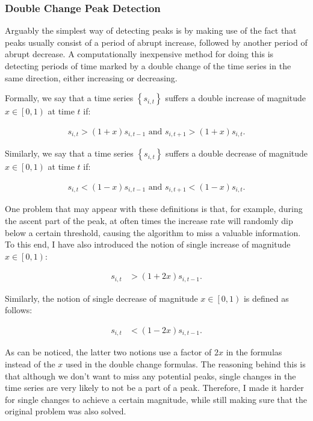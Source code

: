 \subsubsection{Double Change Peak Detection}

Arguably the simplest way of detecting peaks is by making use of the fact that peaks usually consist of a period of abrupt increase, followed by another period of abrupt decrease. A computationally inexpensive method for doing this is detecting periods of time marked by a double change of the time series in the same direction, either increasing or decreasing.

Formally, we say that a time series $\left\{ s_{i, t} \right\}$ suffers a double increase of magnitude $x \in \left[ 0, 1 \right)$ at time $t$ if:

\begin{align}
\label{eq:double-increase}
s_{i, t} > \left( 1 + x \right) s_{i, t - 1} \textrm{ and } s_{i, t + 1} > \left( 1 + x \right) s_{i, t}.
\end{align}

Similarly, we say that a time series $\left\{ s_{i, t} \right\}$ suffers a double decrease of magnitude $x \in \left[ 0, 1 \right)$ at time $t$ if:

\begin{align}
\label{eq:double-increase}
s_{i, t} < \left( 1 - x \right) s_{i, t - 1} \textrm{ and } s_{i, t + 1} < \left( 1 - x \right) s_{i, t}.
\end{align}

One problem that may appear with these definitions is that, for example, during the ascent part of the peak, at often times the increase rate will randomly dip below a certain threshold, causing the algorithm to miss a valuable information. To this end, I have also introduced the notion of single increase of magnitude $x \in \left[ 0, 1 \right)$:

\begin{align}
\label{eq:single-increase}
s_{i, t} &> \left( 1 + 2x \right) s_{i, t - 1}.
\end{align}

Similarly, the notion of single decrease of magnitude $x \in \left[ 0, 1 \right)$ is defined as follows:

\begin{align}
\label{eq:single-decrease}
s_{i, t} &< \left( 1 - 2x \right) s_{i, t - 1}.
\end{align}

As can be noticed, the latter two notions use a factor of $2x$ in the formulas instead of the $x$ used in the double change formulas. The reasoning behind this is that although we don't want to miss any potential peaks, single changes in the time series are very likely to not be a part of a peak. Therefore, I made it harder for single changes to achieve a certain magnitude, while still making sure that the original problem was also solved.

